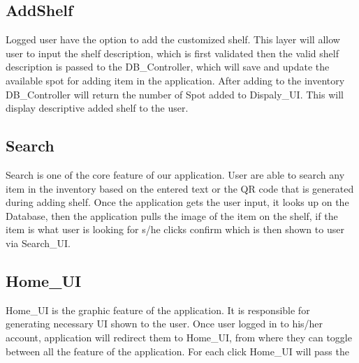 \subsection{AddShelf}
Logged user have the option to add the customized shelf. This layer will allow user to input the shelf description, which is first validated then the valid shelf description is passed to the DB\_Controller, which will save and update the available spot for adding item in the application. After adding to the inventory DB\_Controller will return the number of Spot added to Dispaly\_UI. This will display descriptive added shelf to the user.

\subsection{Search}
Search is one of the core feature of our application. User are able to search any item in the inventory based on the entered text or the QR code that is generated during adding shelf. Once the application gets the user input, it looks up on the Database, then the application pulls the image of the item on the shelf, if the item is what user is looking for s/he clicks confirm which is then shown to user via Search\_UI.

\subsection{Home\_UI}
Home\_UI is the graphic feature of the application. It is responsible for generating necessary UI shown to the user. Once user logged in to his/her account, application will redirect them to Home\_UI, from where they can toggle between all the feature of the application. For each click Home\_UI will pass the 